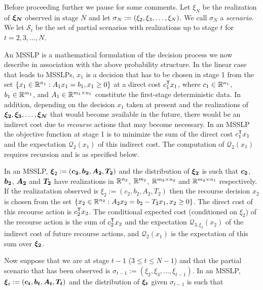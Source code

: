 \par
Before proceeding further we pause for some comments.
Let $\xi_N$ be the realization of $\mathbf{\boldsymbol{\xi_N}}$ observed in stage $N$ and let $\sigma_N:= (\xi_2, \xi_3, \ldots, \xi_N)$.  We call $\sigma_N$ a \emph{scenario}.  We let $\mathcal{S}_t$ be the set of partial scenarios with realizations up to stage $t$ for $t=2,3,\ldots,N$.
\par
An MSSLP is a mathematical formulation of the decision process
we now describe in association with the above probability structure.
In the linear case that leads to MSSLPs,
$x_1$ is a decision that has to be chosen in stage 1 from
the set $\{x_1\in{\mathbb R}^{n_1}: A_1x_1 = b_1, x_1 \geq 0\}$
at a direct cost $c_1^{\mbox{\scriptsize\sf T}} x_1$, 
where $c_1\in{\mathbb R}^{n_1}$,
$b_1\in{\mathbb R}^{m_1}$, and
$A_1\in{\mathbb R}^{m_1\times n_1}$
constitute the first-stage deterministic data.
In addition, depending on the decision $x_1$ taken at present
and the realizations of $\mathbf{\boldsymbol{\xi_2}}, \mathbf{\boldsymbol{\xi_3}}, \ldots,
\mathbf{\boldsymbol{\xi_N}}$ that would become available in the future,
there would be an indirect cost due to {\em recourse} actions
that may become necessary. In an MSSLP the objective
function at stage 1 is to minimize the
sum of the direct cost $c_1^{\mbox{\scriptsize\sf T}} x_1 $
and the expectation $\mathcal{Q}_2 (x_1)$ of this indirect
cost. The computation of $\mathcal{Q}_2(x_1)$ requires
recursion and is as specified below.
\par
In an MSSLP,
$\mathbf{\boldsymbol{\xi}}_2 :=(\mathbf{\boldsymbol{c_2}},\mathbf{\boldsymbol{b_2}}, \mathbf{\boldsymbol{A_2}}, \mathbf{\boldsymbol{T_2}})$
and the distribution of $\mathbf{\boldsymbol{\xi_2}}$ is such that
$\mathbf{\boldsymbol{c_2}}$, $\mathbf{\boldsymbol{b_2}}$, $\mathbf{\boldsymbol{A_2}}$ and
$\mathbf{\boldsymbol{T_2}}$ have realizations in ${\mathbb R}^{n_2}$, ${\mathbb R}^{m_2}$,
${\mathbb R}^{m_2\times n_2}$ and ${\mathbb R}^{m_2\times n_1}$
respectively. If the realizatation observed is $\xi_2 := (c_2,b_2,
A_2, T_2)$ then the recourse decision $x_2$
is chosen from the set $\{x_2\in{\mathbb R}^{n_2}: A_2x_2 = b_2 -T_2x_1,
x_2 \geq 0\}$. The direct cost of this recourse action
is $c_2^{\mbox{\scriptsize\sf T}} x_2$. 
The conditional expected cost (conditioned on $\xi_2$) of the recourse action is the sum of $c_2^{\mbox{\scriptsize\sf T}} x_2$ and the expectation $\mathcal{Q}_{3, \xi_2}(x_2)$ of the indirect cost of future recourse actions, and $\mathcal{Q}_2(x_1)$ is the expectation of this sum over $\mathbf{\boldsymbol{\xi_2}}$.
\par
Now suppose that we are at stage $t-1$ ($3\leq t\leq N-1$) and
that the partial scenario that has been observed is
$\sigma_{t-1}:=(\xi_2, \xi_3, \ldots, \xi_{t-1})$.
In an MSSLP,
$\mathbf{\boldsymbol{\xi}}_t :=(\mathbf{\boldsymbol{c_t}},\mathbf{\boldsymbol{b_t}}, \mathbf{\boldsymbol{A_t}}, \mathbf{\boldsymbol{T_t}})$
and the distribution of $\mathbf{\boldsymbol{\xi_t}}$ given $\sigma _{t-1}$ is such that
